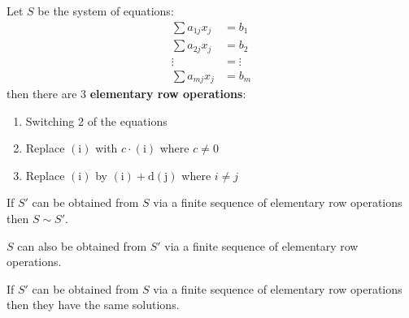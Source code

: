 \begin{definition} 
    Let \(S\) be the system of equations:
    \begin{align}
        \sum a_{1j}x_j & = b_1 \tag{1}     \\
        \sum a_{2j}x_j & = b_2  \tag{2}    \\
        \vdots         & =\vdots \nonumber \\
        \sum a_{mj}x_j & = b_m \tag{m}
    \end{align}
    then there are 3 \textbf{elementary row operations}:
    \begin{enumerate}
        \item Switching 2 of the equations
        \item Replace \(\mathrm{(i)}\) with \(c \cdot \mathrm{(i)}\) where \(c \neq 0\)
        \item Replace \(\mathrm{(i)}\) by \(\mathrm{(i) + d(j)}\) where \(i\neq j\)
    \end{enumerate}
\end{definition}

\begin{proposition}\label{prop:2.2}
    If \(S'\) can be obtained from \(S\) via a finite sequence of elementary row operations then \(S \sim S'\). 
\end{proposition}

\begin{corollary}
    \(S\) can also be obtained from \(S'\) via a finite sequence of elementary row operations.
\end{corollary}
\begin{corollary}
    If \(S'\) can be obtained from \(S\) via a finite sequence of elementary row operations then they have the same solutions.
\end{corollary}
